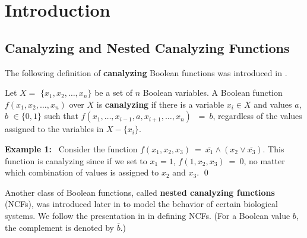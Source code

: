 \section{Introduction} 
\label{sec:intro}

\subsection{Canalyzing and Nested Canalyzing Functions}
\label{sse:ncf_def}

The following definition of \textbf{canalyzing} Boolean functions was introduced
in \cite{Kauffman-1969}.

\begin{definition}\label{def:canalyzing}
Let $X = $ $\{x_1, x_2, \ldots, x_n\}$ be a set of $n$  Boolean variables.
A Boolean function $f(x_1, x_2, \ldots, x_n)$ over $X$ is \textbf{canalyzing}
if there is a variable $x_i \in X$ and values $a$, $b$ $\in \{0,1\}$ such that 
$f(x_1, \ldots, x_{i-1}, a, x_{i+1}, \ldots, x_n)$ $~=~ b$, regardless of the values
assigned to the variables in $X - \{x_i\}$.
\end{definition}

\medskip

\noindent
\textbf{Example 1:}~ Consider the function 
$f(x_1, x_2, x_3) ~=~ \overline{x_1} \wedge (x_2 \vee \overline{x_3})$.
This function is canalyzing since if we set to $x_1 = 1$,
$f(1, x_2, x_3) ~=~ 0$, no matter which combination of values is assigned 
to $x_2$ and $x_3$. \qed

\medskip

Another class of Boolean functions, called \textbf{nested canalyzing functions} (NCFs),
was introduced later in \cite{Kauffman-etal-2003} to model the behavior of
certain biological systems.
We follow the presentation in \cite{Layne-2011} in defining NCFs.
(For a Boolean value $b$,~ the complement is denoted by $\overline{b}$.)

